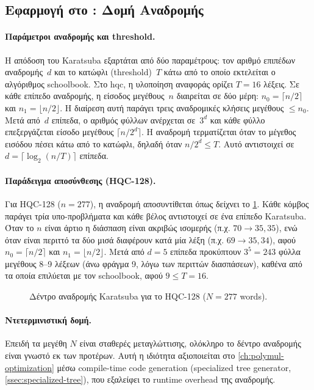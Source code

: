\subsection{Εφαρμογή στο \HQC: Δομή Αναδρομής}
\label{sec:karatsuba-hqc-structure}

\paragraph{Παράμετροι αναδρομής και threshold.}
Η απόδοση του Karatsuba εξαρτάται από δύο παραμέτρους: τον αριθμό επιπέδων
αναδρομής~$d$ και το κατώφλι (threshold)~$T$ κάτω από το οποίο εκτελείται ο
αλγόριθμος schoolbook.
Στο \gls{hqc}, η υλοποίηση αναφοράς ορίζει $T = 16$ λέξεις.
Σε κάθε επίπεδο αναδρομής, η είσοδος μεγέθους~$n$ διαιρείται σε δύο μέρη:
$n_0 = \lceil n/2 \rceil$ και $n_1 = \lfloor n/2 \rfloor$.
Η διαίρεση αυτή παράγει τρεις αναδρομικές κλήσεις μεγέθους $\leq n_0$.
Μετά από~$d$ επίπεδα, ο αριθμός φύλλων ανέρχεται σε~$3^d$ και κάθε φύλλο
επεξεργάζεται είσοδο μεγέθους $\lceil n/2^d \rceil$.
Η αναδρομή τερματίζεται όταν το μέγεθος εισόδου πέσει κάτω από το κατώφλι,
δηλαδή όταν $n/2^d \leq T$. Αυτό αντιστοιχεί σε
$d = \lceil \log_2(n/T) \rceil$ επίπεδα.

\paragraph{Παράδειγμα αποσύνθεσης (HQC-128).}
Για HQC-128 ($n = 277$), η αναδρομή αποσυντίθεται όπως δείχνει το
\cref{fig:karatsuba-recursion-tree}. Κάθε κόμβος παράγει τρία
υπο-προβλήματα και κάθε βέλος αντιστοιχεί σε ένα επίπεδο Karatsuba. Όταν
το $n$ είναι άρτιο η διάσπαση είναι ακριβώς ισομερής (π.χ. $70 \to 35,
35$), ενώ όταν είναι περιττό τα δύο μισά διαφέρουν κατά μία λέξη (π.χ.
$69 \to 35, 34$), αφού $n_0 = \lceil n/2 \rceil$ και
$n_1 = \lfloor n/2 \rfloor$. Μετά από $d = 5$ επίπεδα προκύπτουν
$3^5 = 243$ φύλλα μεγέθους 8–9 λέξεων (άνω φράγμα 9, λόγω των περιττών
διασπάσεων), καθένα από τα οποία επιλύεται με τον schoolbook, αφού
$9 \leq T = 16$.

\begin{figure}[htbp]
  \centering
  \resizebox{\linewidth}{!}{}
  \caption{Δέντρο αναδρομής Karatsuba για το HQC-128 ($N = 277$ words).}
  \label{fig:karatsuba-recursion-tree}
\end{figure}

\paragraph{Ντετερμινιστική δομή.}
Επειδή τα μεγέθη $N$ είναι σταθερές μεταγλώττισης, ολόκληρο το δέντρο αναδρομής
είναι γνωστό εκ των προτέρων. Αυτή η ιδιότητα αξιοποιείται στο
\cref{ch:polymul-optimization} μέσω compile-time code generation (specialized tree generator,
\cref{ssec:specialized-tree}), που εξαλείφει το runtime overhead της αναδρομής.

